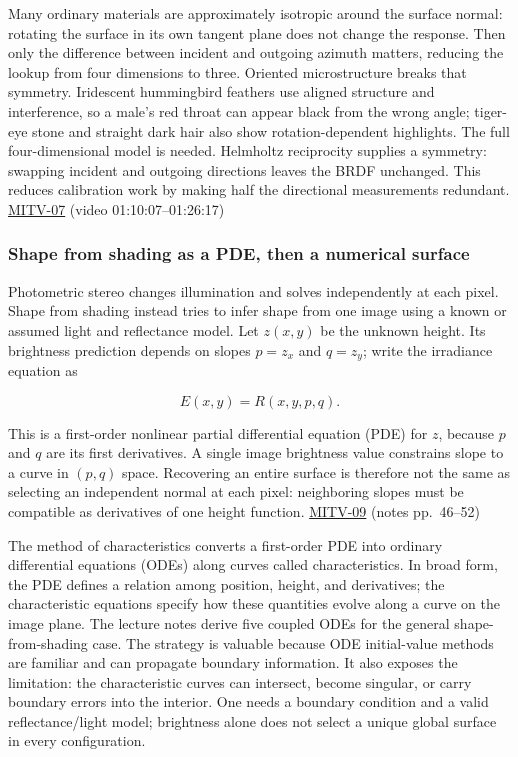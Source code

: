 Many ordinary materials are approximately isotropic around the surface normal: rotating the surface in its own tangent plane does not change the response. Then only the difference between incident and outgoing azimuth matters, reducing the lookup from four dimensions to three. Oriented microstructure breaks that symmetry. Iridescent hummingbird feathers use aligned structure and interference, so a male's red throat can appear black from the wrong angle; tiger-eye stone and straight dark hair also show rotation-dependent highlights. The full four-dimensional model is needed. Helmholtz reciprocity supplies a symmetry: swapping incident and outgoing directions leaves the BRDF unchanged. This reduces calibration work by making half the directional measurements redundant. \hyperref[04-visual-computing-ii-ch036]{MITV-07} (video 01:10:07--01:26:17)

\subsubsection{Shape from shading as a PDE, then a numerical surface}\label{shape-from-shading-as-a-pde-then-a-numerical-surface}

Photometric stereo changes illumination and solves independently at each pixel. Shape from shading instead tries to infer shape from one image using a known or assumed light and reflectance model. Let \(z(x,y)\) be the unknown height. Its brightness prediction depends on slopes \(p=z_x\) and \(q=z_y\); write the irradiance equation as

\[
E(x,y)=R(x,y,p,q).
\]

This is a first-order nonlinear partial differential equation (PDE) for \(z\), because \(p\) and \(q\) are its first derivatives. A single image brightness value constrains slope to a curve in \((p,q)\) space. Recovering an entire surface is therefore not the same as selecting an independent normal at each pixel: neighboring slopes must be compatible as derivatives of one height function. \hyperref[04-visual-computing-ii-ch036]{MITV-09} (notes pp.~46--52)

The method of characteristics converts a first-order PDE into ordinary differential equations (ODEs) along curves called characteristics. In broad form, the PDE defines a relation among position, height, and derivatives; the characteristic equations specify how these quantities evolve along a curve on the image plane. The lecture notes derive five coupled ODEs for the general shape-from-shading case. The strategy is valuable because ODE initial-value methods are familiar and can propagate boundary information. It also exposes the limitation: the characteristic curves can intersect, become singular, or carry boundary errors into the interior. One needs a boundary condition and a valid reflectance/light model; brightness alone does not select a unique global surface in every configuration.

